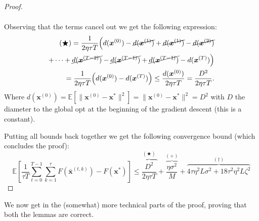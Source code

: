 \begin{proof}
\begin{enumerate}
\begin{align*}
        \end{align*}
        Observing that the terms cancel out we get the following expression: 
        \begin{align*}
        (\bigstar)= \frac{1}{2 \eta \tau T} \Big( d(\bm{x}^{(0)}) - \cancel{d(\bm{x}^{(1)})} +  \cancel{ d(\bm{x}^{(1)})} - \cancel{d(\bm{x}^{(2)})}  \\
        + \cdots + \cancel{ d(\bm{x}^{(T-2)}) } - \cancel{ d(\bm{x}^{(T-1)}) } + \cancel{ d(\bm{x}^{(T-1)}) } -  d(\bm{x}^{(T)}) \Big) \\= \frac{1}{2 \eta \tau T} \Big( d(\bm{x}^{(0)})  -  d(\bm{x}^{(T)}) \Big) \leq \frac{d(\bm{x}^{(0)})}{2 \eta \tau T} = \frac{D^2}{2 \eta \tau T} .
        \end{align*}
        Where $d(\bm{x}^{(0)}) = \mathbb{E}[\| \bm{x}^{(0)} -\bm{x}^* \|^2] = \| \bm{x}^{(0)} -\bm{x}^* \|^2 = D^2$ with $D$ the diameter to the global opt at the beginning of the gradient descent (this is a constant).
    \end{enumerate}
    Putting all bounds back together we get the following convergence bound (which concludes the proof):
    \[\mathbb{E} \left[ \frac{1}{\tau T} \sum_{t=0}^{T-1}\sum_{k=1}^{\tau} F(\bar{\bm{x}}^{(t,k)}) - F(\bm{x}^*)\right] 
    \leq \overbrace{\frac{D^2}{2 \eta \tau T} }^{(\bigstar)}+\overbrace{ \frac{\eta \sigma^2}{M}}^{(\diamond)} + \overbrace{4 \tau \eta^2 L \sigma^2 + 18 \tau^2 \eta^2 L \zeta^2}^{(\dagger)} \]
    
\end{proof}

We now get in the (somewhat) more technical parts of the proof, proving that both the lemmas are correct. 

